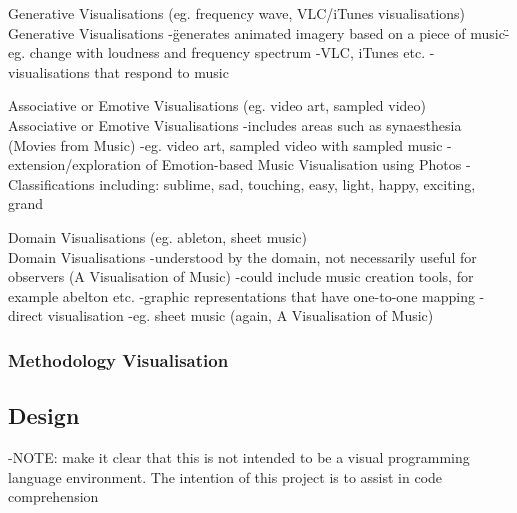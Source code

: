 Generative Visualisations (eg. frequency wave, VLC/iTunes visualisations)\\

Generative Visualisations
-\"generates animated imagery based on a piece of music\"
-eg. change with loudness and frequency spectrum
-VLC, iTunes etc.
-visualisations that respond to music

Associative or Emotive Visualisations (eg. video art, sampled video)\\

Associative or Emotive Visualisations
-includes areas such as synaesthesia (Movies from Music)
-eg. video art, sampled video with sampled music
-extension/exploration of Emotion-based Music Visualisation using Photos
-Classifications including: sublime, sad, touching, easy, light, happy, exciting, grand


Domain Visualisations (eg. ableton, sheet music)\\

Domain Visualisations
-understood by the domain, not necessarily useful for observers (A Visualisation of Music)
-could include music creation tools, for example abelton etc.
-graphic representations that have one-to-one mapping
-direct visualisation
-eg. sheet music (again, A Visualisation of Music)

\subsubsection{Methodology Visualisation}


\subsection{Design}

-NOTE: make it clear that this is not intended to be a visual programming language environment. The intention of this project is to assist in code comprehension 


